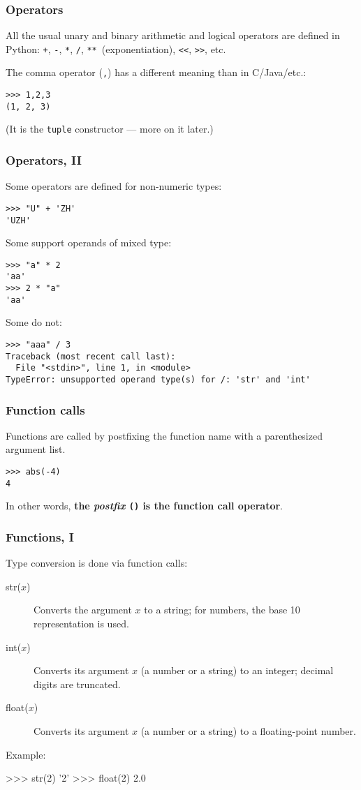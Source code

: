 \documentclass[english,serif,mathserif,xcolor=pdftex,dvipsnames,table]{beamer}
\begin{document}
\begin{frame}[fragile]
  \frametitle{Operators}
  All the usual unary and binary arithmetic and logical operators are
  defined in Python: \texttt{+}, \texttt{-}, \texttt{*}, \texttt{/},
  \texttt{**}~(exponentiation), \texttt{<<}, \texttt{>>}, etc.

  \+
  The comma operator (\texttt{,}) has a different meaning than in C/Java/etc.:
\begin{lstlisting}
>>> 1,2,3
(1, 2, 3)
\end{lstlisting}
  (It is the \texttt{tuple} constructor --- more on it later.)
\end{frame}

\begin{frame}[fragile]
  \frametitle{Operators, II}
  Some operators are defined for non-numeric types:
\begin{lstlisting}
>>> "U" + 'ZH'
'UZH'
\end{lstlisting}

  \+ 
  Some support operands of mixed type:
\begin{lstlisting}
>>> "a" * 2
'aa'
>>> 2 * "a"
'aa'
\end{lstlisting}

  \+
  Some do not:
\begin{lstlisting}[basicstyle=\footnotesize\ttfamily]
>>> "aaa" / 3
Traceback (most recent call last):
  File "<stdin>", line 1, in <module>
TypeError: unsupported operand type(s) for /: 'str' and 'int'
\end{lstlisting}
\end{frame}


\begin{frame}[fragile]
  \frametitle{Function calls}
  Functions are called by postfixing the function name with a
  parenthesized argument list.

  \+
\begin{lstlisting}
>>> abs(-4)
4
\end{lstlisting}

  \+
  In other words, \textbf{the \emph{postfix} \texttt{()} is the function call operator}.
\end{frame}


\begin{frame}
  \frametitle{Functions, I}

  Type conversion is done via function calls:
  \begin{description}
  \item[str($x$)] Converts the argument $x$ to a string; for numbers,
    the base 10 representation is used.
  \item[int($x$)] Converts its argument $x$ (a number or a string) to an integer;
    decimal digits are truncated.
  \item[float($x$)] Converts its argument $x$ (a number or a string) to a
    floating-point number.
  \end{description}

  \+ 
  Example:
\begin{semiverbatim}
>>> str(2)
'2'
>>> float(2)
2.0
\end{semiverbatim}
\end{frame}
\end{document}
